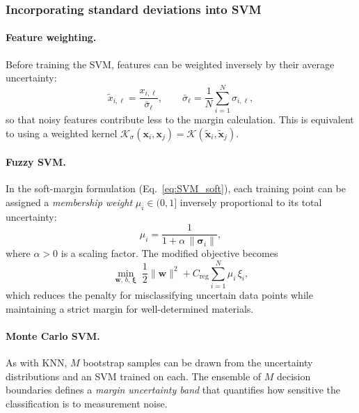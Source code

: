	\subsubsection{Incorporating standard deviations into SVM}

	\paragraph{Feature weighting.}
	Before training the SVM, features can be weighted inversely
	by their average uncertainty:
	\begin{equation}
		\tilde{x}_{i,\ell}
		= \frac{x_{i,\ell}}
		{\bar{\sigma}_\ell},
		\qquad
		\bar{\sigma}_\ell
		= \frac{1}{N}\sum_{i=1}^{N}\sigma_{i,\ell},
	\end{equation}
	so that noisy features contribute less to the margin
	calculation.  This is equivalent to using a weighted kernel
	$\mathcal{K}_\sigma(\mathbf{x}_i, \mathbf{x}_j)
	= \mathcal{K}(\tilde{\mathbf{x}}_i, \tilde{\mathbf{x}}_j)$.

	\paragraph{Fuzzy SVM.}
	In the soft-margin formulation
	(Eq.~\eqref{eq:SVM_soft}), each training point can be
	assigned a \emph{membership weight} $\mu_i \in (0,1]$
	inversely proportional to its total uncertainty:
	\begin{equation}
		\mu_i = \frac{1}{1 + \alpha\,\|\boldsymbol{\sigma}_i\|},
		\label{eq:fuzzy_weight}
	\end{equation}
	where $\alpha > 0$ is a scaling factor.  The modified
	objective becomes
	\begin{equation}
		\min_{\mathbf{w},\,b,\,\boldsymbol{\xi}}\;
		\frac{1}{2}\|\mathbf{w}\|^2
		+ C_{\mathrm{reg}}\sum_{i=1}^{N}\mu_i\,\xi_i,
		\label{eq:fuzzy_SVM}
	\end{equation}
	which reduces the penalty for misclassifying uncertain
	data points while maintaining a strict margin for
	well-determined materials.

	\paragraph{Monte Carlo SVM.}
	As with KNN, $M$ bootstrap samples can be drawn from the
	uncertainty distributions and an SVM trained on each.
	The ensemble of $M$ decision boundaries defines a
	\emph{margin uncertainty band} that quantifies how
	sensitive the classification is to measurement noise.

